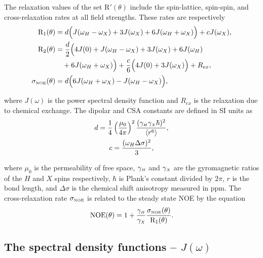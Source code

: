 \begin{htmlonly}
\begin{htmlonly}
The relaxation values of the set R$'(\theta)$ include the spin-lattice, spin-spin, and cross-relaxation rates at all field strengths.  These rates are respectively \citep{Abragam61}
\begin{subequations}
\begin{align}
    \mathrm{R}_1(\theta) &= d \Big( J(\omega_H - \omega_X) + 3J(\omega_X) + 6J(\omega_H + \omega_X) \Big) + cJ(\omega_X),     \label{eq: R1} \\
    \mathrm{R}_2(\theta) &= \frac{d}{2} \Big( 4J(0) + J(\omega_H - \omega_X) + 3J(\omega_X) + 6J(\omega_H)                    \nonumber \\
        & \quad + 6J(\omega_H + \omega_X) \Big) + \frac{c}{6} \Big( 4J(0) + 3J(\omega_X) \Big) + R_{ex},              \label{eq: R2} \\  
    \sigma_{\scriptscriptstyle \mathrm{NOE}}(\theta) &= d \Big( 6J(\omega_H + \omega_X) - J(\omega_H - \omega_X) \Big),                              \label{eq: sigma_NOE}
\end{align}
\end{subequations}

\noindent where $J(\omega)$ is the power spectral density function and $R_{ex}$ is the relaxation due to chemical exchange.  The dipolar and CSA constants are defined in SI units as
\begin{gather}
 d = \frac{1}{4} \left(\frac{\mu_0}{4\pi}\right)^2 \frac{(\gamma_{\scriptscriptstyle H} \gamma_{\scriptscriptstyle X} \hbar)^2}{\langle r^6 \rangle}, \label{eq: dipolar constant} \\
 c = \frac{(\omega_H \Delta\sigma)^2}{3}, \label{eq: CSA constant}
\end{gather}

\noindent where $\mu_0$ is the permeability of free space, $\gamma_{\scriptscriptstyle H}$ and $\gamma_{\scriptscriptstyle X}$ are the gyromagnetic ratios of the $H$ and $X$ spins respectively, $\hbar$ is Plank's constant divided by $2\pi$, $r$ is the bond length, and $\Delta\sigma$ is the chemical shift anisotropy measured in ppm.  The cross-relaxation rate $\sigma_{\scriptscriptstyle \mathrm{NOE}}$ is related to the steady state NOE by the equation
\begin{equation} \label{eq: NOE}
 \mathrm{NOE}(\theta) = 1 + \frac{\gamma_{\scriptscriptstyle H}}{\gamma_{\scriptscriptstyle X}} \frac{\sigma_{\scriptscriptstyle \mathrm{NOE}}(\theta)}{\mathrm{R}_1(\theta)}.
\end{equation}



\begin{latexonly}
    \subsection{The spectral density functions -- $J(\omega)$}
\end{latexonly}
\begin{htmlonly}

\end{htmlonly}
\end{htmlonly}
\end{htmlonly}
